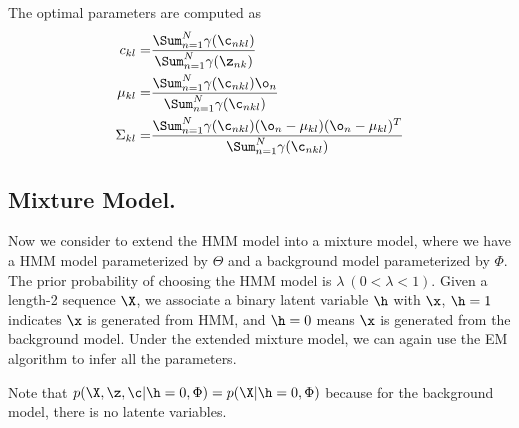 The optimal parameters are computed as
\begin{align*}
  c_{kl} = & \frac{\Sum_{n=1}^N \gamma(\c_{nkl})}{\Sum_{n=1}^N \gamma(\z_{nk})} \\
  \mu_{kl} = & \frac{\Sum_{n=1}^N \gamma(\c_{nkl}) \o_n}{\Sum_{n=1}^N \gamma(\c_{nkl})} \\
  \Sigma_{kl} = & \frac{\Sum_{n=1}^N \gamma(\c_{nkl}) (\o_n - \mu_{kl}) (\o_n - \mu_{kl})^T }{\Sum_{n=1}^N \gamma(\c_{nkl})} \\
\end{align*}

\subsection{Mixture Model.}


Now we consider to extend the HMM model into a mixture model, where we have a HMM model 
parameterized by $\Theta$ and a background model parameterized by $\Phi$. The prior probability
of choosing the HMM model is $\lambda ~(0 < \lambda < 1)$. Given a length-2
sequence $\X$, we associate a binary latent variable $\h$ with $\x$, $\h=1$ indicates $\x$ is 
generated from HMM, and $\h=0$ means $\x$ is generated from the background model. Under the extended
mixture model, we can again use the EM algorithm to infer all the parameters.

Note that $
 p(\X, \z, \c| \h=0, \Phi) = 
 p(\X| \h=0, \Phi)$ because for the background model, there is no latente variables.

